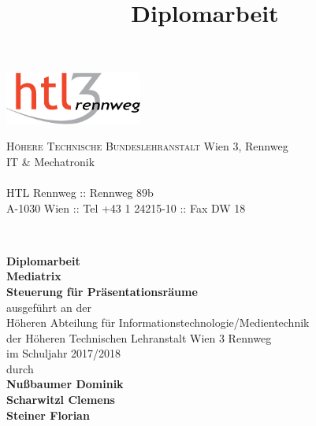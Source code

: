 \documentclass[
    headings=optiontotocandhead,%
    twoside,
    numbers=noenddot,%
    toc=flat, %
    12pt, %
    titlepage, %
    parskip=full, %
    listof=totoc, %
    listof=flat, %
    numbers=noenddot, %
    bibliography=totoc, %
    a4paper,DIV=14,
    BCOR=15mm,
]{scrbook}
\begin{document}
\newcommand{\kapitelautor}{}


\frontmatter %
\title{Diplomarbeit}
\begin{titlepage}
\begin{minipage}[b]{1\columnwidth}
\parbox[b]{50mm}{\includegraphics[width=45mm]{HTL3RLogoRGB}}
\hfill
\parbox[b]{130mm}{\footnotesize \textsc{Höhere Technische Bundeslehranstalt} Wien 3, Rennweg\\
IT \& Mechatronik\\
\\
HTL Rennweg :: Rennweg 89b\\
A-1030 Wien :: Tel +43 1 24215-10 :: Fax DW 18
}\\
\mbox{}
\end{minipage}

\vspace{1cm}


\begin{center}
\textbf{\LARGE{Diplomarbeit}}{\large{}}\\
{\large{}\vspace{15mm}
 }\textbf{\large{Mediatrix}}\\
\textbf{\large{Steuerung für Präsentationsräume}}\\
 \vspace{15mm}
 ausgeführt an der\\
 Höheren Abteilung für Informationstechnologie/Medientechnik\\
 der Höheren Technischen Lehranstalt Wien 3 Rennweg\\
 \vspace{1cm}
 im Schuljahr 2017/2018\\
 \vspace{1cm}
 durch\\
 \vspace{0.5cm}
\textbf{\large{}Nußbaumer Dominik}\\
\textbf{\large{}Scharwitzl Clemens}\\
\textbf{\large{}Steiner Florian}\\


\end{center}
\end{titlepage}
\end{document}
